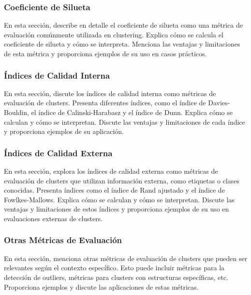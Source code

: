 \documentclass{article}
\begin{document}
\subsubsection{Coeficiente de Silueta}
En esta sección, describe en detalle el coeficiente de silueta como una métrica de evaluación comúnmente utilizada en clustering. Explica cómo se calcula el coeficiente de silueta y cómo se interpreta. Menciona las ventajas y limitaciones de esta métrica y proporciona ejemplos de su uso en casos prácticos.

\subsubsection{Índices de Calidad Interna}
En esta sección, discute los índices de calidad interna como métricas de evaluación de clusters. Presenta diferentes índices, como el índice de Davies-Bouldin, el índice de Calinski-Harabasz y el índice de Dunn. Explica cómo se calculan y cómo se interpretan. Discute las ventajas y limitaciones de cada índice y proporciona ejemplos de su aplicación.

\subsubsection{Índices de Calidad Externa}
En esta sección, explora los índices de calidad externa como métricas de evaluación de clusters que utilizan información externa, como etiquetas o clases conocidas. Presenta índices como el índice de Rand ajustado y el índice de Fowlkes-Mallows. Explica cómo se calculan y cómo se interpretan. Discute las ventajas y limitaciones de estos índices y proporciona ejemplos de su uso en evaluaciones externas de clusters.

\subsubsection{Otras Métricas de Evaluación}
En esta sección, menciona otras métricas de evaluación de clusters que pueden ser relevantes según el contexto específico. Esto puede incluir métricas para la detección de outliers, métricas para clusters con estructuras específicas, etc. Proporciona ejemplos y discute las aplicaciones de estas métricas.
\end{document}
